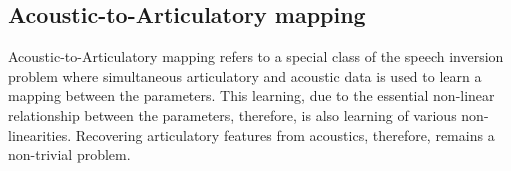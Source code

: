\documentclass{article}[12pt]
\begin{document}
\subsection{Acoustic-to-Articulatory mapping}
Acoustic-to-Articulatory mapping refers to a special class of the speech inversion problem where simultaneous articulatory and acoustic data is used to learn a mapping between the parameters. This learning, due to the essential non-linear relationship between the parameters, therefore, is also learning of various non-linearities. Recovering articulatory features from acoustics, therefore, remains a non-trivial problem.
\cite{toutios2003}
\cite{badino2016,canevari2013,cernak2016}


\end{document}
